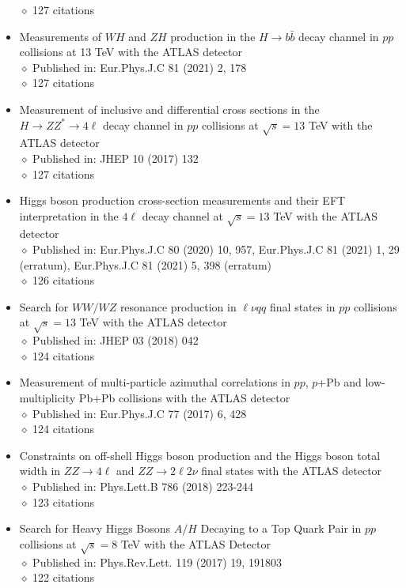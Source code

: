 \documentclass[margin, 10pt]{res} %
\begin{document}
\begin{resume}
\begin{itemize}
$\diamond$ 127 citations
\item Measurements of $WH$ and $ZH$ production in the $H \rightarrow b\bar{b}$ decay channel in $pp$ collisions at 13 TeV with the ATLAS detector\\
$\diamond$ Published in: Eur.Phys.J.C 81 (2021) 2, 178\\
$\diamond$ 127 citations
\item Measurement of inclusive and differential cross sections in the $H \rightarrow ZZ^{*} \rightarrow 4\ell$ decay channel in $pp$ collisions at $\sqrt{s} = 13$ TeV with the ATLAS detector\\
$\diamond$ Published in: JHEP 10 (2017) 132\\
$\diamond$ 127 citations
\item Higgs boson production cross-section measurements and their EFT interpretation in the $4\ell$ decay channel at $\sqrt{s} = 13$ TeV with the ATLAS detector\\
$\diamond$ Published in: Eur.Phys.J.C 80 (2020) 10, 957, Eur.Phys.J.C 81 (2021) 1, 29 (erratum), Eur.Phys.J.C 81 (2021) 5, 398 (erratum)\\
$\diamond$ 126 citations
\item Search for $WW/WZ$ resonance production in $\ell \nu qq$ final states in $pp$ collisions at $\sqrt{s} = 13$ TeV with the ATLAS detector\\
$\diamond$ Published in: JHEP 03 (2018) 042\\
$\diamond$ 124 citations
\item Measurement of multi-particle azimuthal correlations in $pp$, $p$+Pb and low-multiplicity Pb+Pb collisions with the ATLAS detector\\
$\diamond$ Published in: Eur.Phys.J.C 77 (2017) 6, 428\\
$\diamond$ 124 citations
\item Constraints on off-shell Higgs boson production and the Higgs boson total width in $ZZ \rightarrow 4\ell$ and $ZZ \rightarrow 2\ell 2\nu$ final states with the ATLAS detector\\
$\diamond$ Published in: Phys.Lett.B 786 (2018) 223-244\\
$\diamond$ 123 citations
\item Search for Heavy Higgs Bosons $A/H$ Decaying to a Top Quark Pair in $pp$ collisions at $\sqrt{s} = 8$ TeV with the ATLAS Detector\\
$\diamond$ Published in: Phys.Rev.Lett. 119 (2017) 19, 191803\\
$\diamond$ 122 citations

\end{itemize}
\end{resume}
\end{document}
